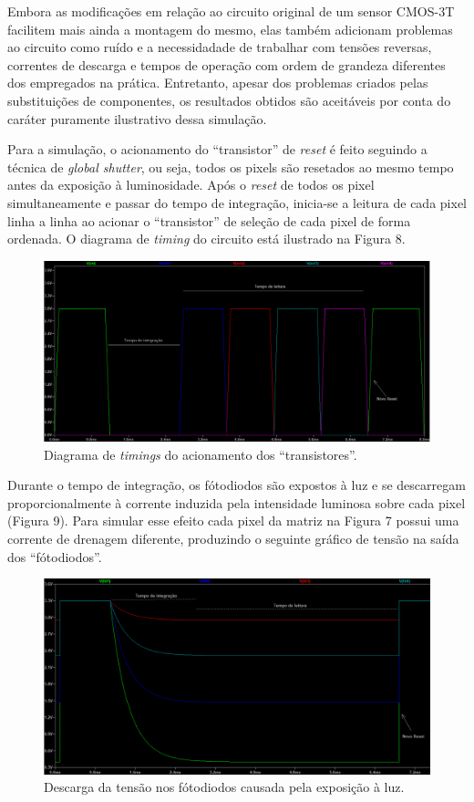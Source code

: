 \documentclass[10pt,a4paper,twocolumn]{article}
\begin{document}
	Embora as modificações em relação ao circuito original de um sensor CMOS-3T facilitem mais ainda a montagem do mesmo, elas também adicionam problemas ao circuito como ruído e a necessidadade de trabalhar com tensões reversas, correntes de descarga e tempos de operação com ordem de grandeza diferentes dos empregados na prática. Entretanto, apesar dos problemas criados pelas substituições de componentes, os resultados obtidos são aceitáveis por conta do caráter puramente ilustrativo dessa simulação.

	Para a simulação, o acionamento do ``transistor'' de \textit{reset} é feito seguindo a técnica de \textit{global shutter}, ou seja, todos os pixels são resetados ao mesmo tempo antes da exposição à luminosidade. Após o \textit{reset} de todos os pixel simultaneamente e passar do tempo de integração, inicia-se a leitura de cada pixel linha a linha ao acionar o ``transistor'' de seleção de cada pixel de forma ordenada. O diagrama de \textit{timing} do circuito está ilustrado na Figura 8.
	
	\begin{figure}[H]
	\centering
	\includegraphics[scale=0.258]{imagens/timings.png}
	\caption{Diagrama de \textit{timings} do acionamento dos ``transistores''.}
	\end{figure}

	Durante o tempo de integração, os fótodiodos são expostos à luz e se descarregam proporcionalmente à corrente induzida pela intensidade luminosa sobre cada pixel (Figura 9). Para simular esse efeito cada pixel da matriz na Figura 7 possui uma corrente de drenagem diferente, produzindo o seguinte gráfico de tensão na saída dos ``fótodiodos''.
	
	\begin{figure}[!h]
		\centering
		\includegraphics[scale=0.28]{imagens/descarga.png}
		\caption{Descarga da tensão nos fótodiodos causada pela exposição à luz.}
	\end{figure}
\end{document}
